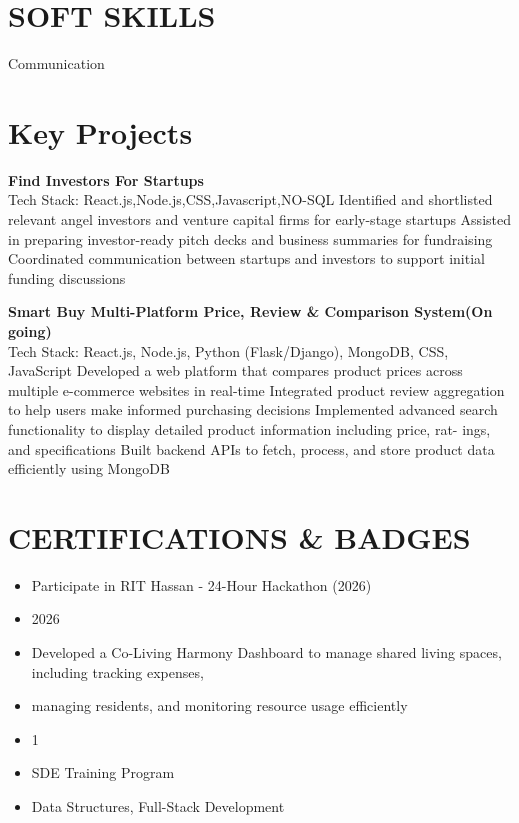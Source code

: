 \documentclass[10pt,a4paper]{article}
\begin{document}
\section*{SOFT SKILLS}
\noindent Communication \vspace{4pt}



\section*{Key Projects}
\noindent \textbf{Find Investors For Startups} \\
Tech Stack: React.js,Node.js,CSS,Javascript,NO-SQL Identified and shortlisted relevant angel investors and venture capital firms for early-stage startups Assisted in preparing investor-ready pitch decks and business summaries for fundraising Coordinated communication between startups and investors to support initial funding discussions \vspace{4pt}

\noindent \textbf{Smart Buy Multi-Platform Price, Review \& Comparison System(On going)} \\
Tech Stack: React.js, Node.js, Python (Flask/Django), MongoDB, CSS, JavaScript Developed a web platform that compares product prices across multiple e-commerce websites in real-time Integrated product review aggregation to help users make informed purchasing decisions Implemented advanced search functionality to display detailed product information including price, rat- ings, and specifications Built backend APIs to fetch, process, and store product data efficiently using MongoDB \vspace{4pt}


\section*{CERTIFICATIONS \& BADGES}
\begin{itemize}[leftmargin=0.2in, itemsep=1pt, topsep=1pt]
    \item Participate in RIT Hassan - 24-Hour Hackathon (2026)
    \item 2026
    \item Developed a Co-Living Harmony Dashboard to manage shared living spaces, including tracking expenses,
    \item managing residents, and monitoring resource usage efficiently
    \item 1
    \item SDE Training Program
    \item Data Structures, Full-Stack Development
\end{itemize}
\end{document}
